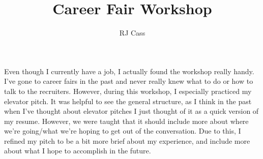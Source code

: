 \documentclass{article}
\author{RJ Cass}
\title{Career Fair Workshop}
\begin{document}
\maketitle

Even though I currently have a job, I actually found the workshop really handy. I've gone to career fairs in the past and never really knew what to do or how to talk to the recruiters. However, during this workshop, I especially practiced my elevator pitch. It was helpful to see the general structure, as I think in the past when I've thought about elevator pitches I just thought of it as a quick version of my resume. However, we were taught that it should include more about where we're going/what we're hoping to get out of the conversation. Due to this, I refined my pitch to be a bit more brief about my experience, and include more about what I hope to accomplish in the future. 
\end{document}

